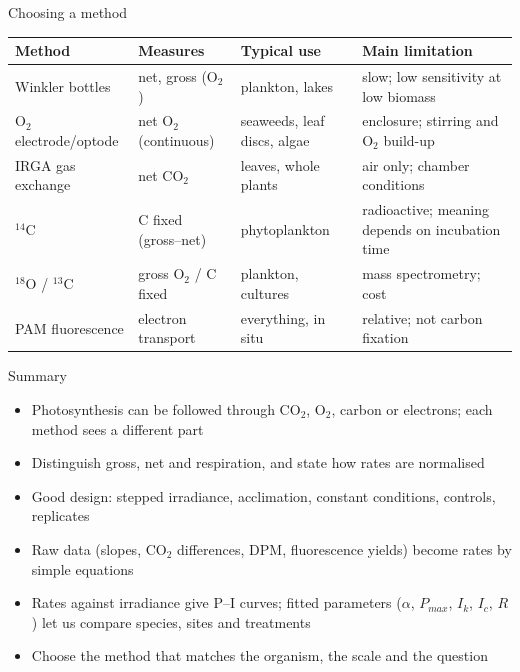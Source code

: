 \documentclass[aspectratio=169,11pt]{beamer}
\begin{document}
\begin{frame}{Choosing a method}
\centering\footnotesize
\renewcommand{\arraystretch}{1.25}
\begin{tabular}{@{}>{\raggedright\arraybackslash}p{2.6cm}>{\raggedright\arraybackslash}p{2.7cm}>{\raggedright\arraybackslash}p{3.0cm}>{\raggedright\arraybackslash}p{4.5cm}@{}}
\toprule
\textbf{Method} & \textbf{Measures} & \textbf{Typical use} & \textbf{Main limitation}\\\midrule
Winkler bottles & net, gross (O$_2$) & plankton, lakes & slow; low sensitivity at low biomass\\
O$_2$ electrode/optode & net O$_2$ (continuous) & seaweeds, leaf discs, algae & enclosure; stirring and O$_2$ build-up\\
IRGA gas exchange & net CO$_2$ & leaves, whole plants & air only; chamber conditions\\
$^{14}$C & C fixed (gross--net) & phytoplankton & radioactive; meaning depends on incubation time\\
$^{18}$O / $^{13}$C & gross O$_2$ / C fixed & plankton, cultures & mass spectrometry; cost\\
PAM fluorescence & electron transport & everything, in situ & relative; not carbon fixation\\
\bottomrule
\end{tabular}
\end{frame}

\begin{frame}{Summary}
\begin{itemize}
  \item Photosynthesis can be followed through CO$_2$, O$_2$, carbon or electrons; each method sees a different part
  \item Distinguish gross, net and respiration, and state how rates are normalised
  \item Good design: stepped irradiance, acclimation, constant conditions, controls, replicates
  \item Raw data (slopes, CO$_2$ differences, DPM, fluorescence yields) become rates by simple equations
  \item Rates against irradiance give P--I curves; fitted parameters ($\alpha$, $P_{max}$, $I_k$, $I_c$, $R$) let us compare species, sites and treatments
  \item Choose the method that matches the organism, the scale and the question
\end{itemize}
\end{frame}
\end{document}
